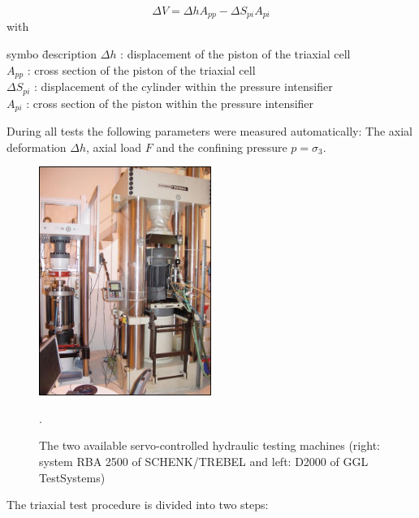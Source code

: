 \begin{equation}
\Delta V = \Delta h A_{pp} -\Delta S_{pi} A_{pi}
\end{equation}
with
\begin{tabbing}
symbo \= description \kill
$\Delta h$ : \> displacement of the piston of the triaxial cell \\
$A_{pp}$ : \> cross section of the piston of the triaxial cell \\
$\Delta S_{pi}$ : \> displacement of the cylinder within the pressure intensifier \\
$A_{pi}$ : \> cross section of the piston within the pressure intensifier \\
\end{tabbing}

During all tests the following parameters were measured automatically: The axial deformation $\Delta h$, axial load $F$ and the confining pressure $p = \sigma_3$. 

\begin{figure}[!ht]
\centering
\includegraphics[width=0.5\textwidth]{./figures/ifg-lab-photo3.png}
\caption{The two available servo-controlled hydraulic testing machines (right: system RBA 2500 of SCHENK/TREBEL and left: D2000 of GGL TestSystems)}.
\label{fig:ifglabph2}
\end{figure}

The triaxial test procedure is divided into two steps:

